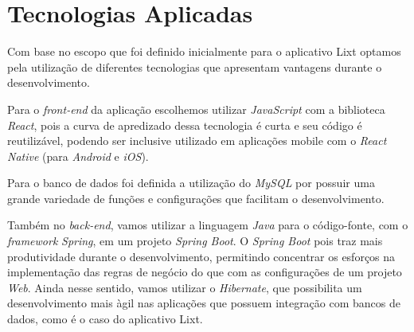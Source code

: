 \chapter{Tecnologias Aplicadas}

Com base no escopo que foi definido inicialmente para o aplicativo Lixt 
optamos pela utilização de diferentes tecnologias que apresentam vantagens 
durante o desenvolvimento.

Para o \textit{front-end} da aplicação escolhemos utilizar \textit{JavaScript} 
com a biblioteca \textit{React}, pois a curva de apredizado dessa tecnologia 
é curta e seu código é reutilizável, podendo ser inclusive utilizado em aplicações 
mobile com o \textit{React Native} (para \textit{Android} e \textit{iOS}).

Para o banco de dados foi definida a utilização do \textit{MySQL} por possuir uma 
grande variedade de funções e configurações que facilitam o desenvolvimento.

Também no \textit{back-end}, vamos utilizar a linguagem \textit{Java} para o código-fonte, com 
o \textit{framework} \textit{Spring}, em um projeto \textit{Spring Boot}. O 
\textit{Spring Boot} pois traz mais produtividade durante o desenvolvimento, permitindo concentrar os esforços na implementação das regras de negócio do que com as configurações de um projeto \textit{Web}. Ainda nesse sentido, vamos utilizar o \textit{Hibernate}, que possibilita um desenvolvimento mais àgil nas aplicações que possuem integração com bancos de dados, como é o caso do aplicativo Lixt.

